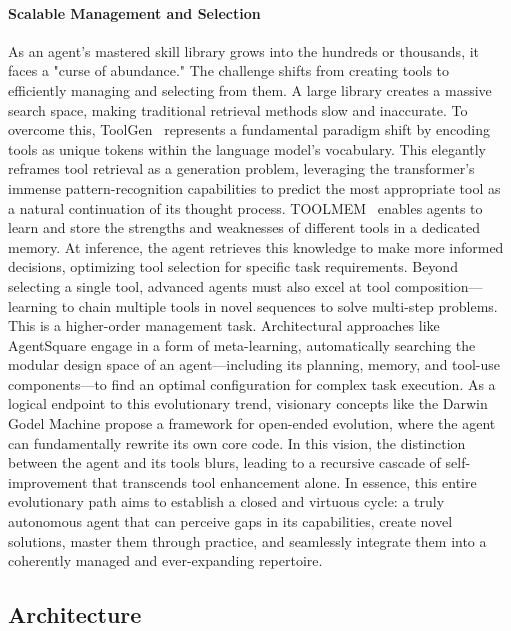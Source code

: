 \paragraph{Scalable Management and Selection}
As an agent's mastered skill library grows into the hundreds or thousands, it faces a "curse of abundance." The challenge shifts from creating tools to efficiently managing and selecting from them. A large library creates a massive search space, making traditional retrieval methods slow and inaccurate. To overcome this, ToolGen~\citep{wang2025toolgen} represents a fundamental paradigm shift by encoding tools as unique tokens within the language model's vocabulary. This elegantly reframes tool retrieval as a generation problem, leveraging the transformer's immense pattern-recognition capabilities to predict the most appropriate tool as a natural continuation of its thought process. TOOLMEM~\citep{xiao2025toolmem} enables agents to learn and store the strengths and weaknesses of different tools in a dedicated memory. At inference, the agent retrieves this knowledge to make more informed decisions, optimizing tool selection for specific task requirements.
Beyond selecting a single tool, advanced agents must also excel at tool composition—learning to chain multiple tools in novel sequences to solve multi-step problems. This is a higher-order management task. Architectural approaches like AgentSquare engage in a form of meta-learning, automatically searching the modular design space of an agent—including its planning, memory, and tool-use components—to find an optimal configuration for complex task execution\citep{shang2025agentsquare}. As a logical endpoint to this evolutionary trend, visionary concepts like the Darwin Godel Machine propose a framework for open-ended evolution, where the agent can fundamentally rewrite its own core code. In this vision, the distinction between the agent and its tools blurs, leading to a recursive cascade of self-improvement that transcends tool enhancement alone\citep{zhang2025darwin}. In essence, this entire evolutionary path aims to establish a closed and virtuous cycle: a truly autonomous agent that can perceive gaps in its capabilities, create novel solutions, master them through practice, and seamlessly integrate them into a coherently managed and ever-expanding repertoire.




\subsection{Architecture}

